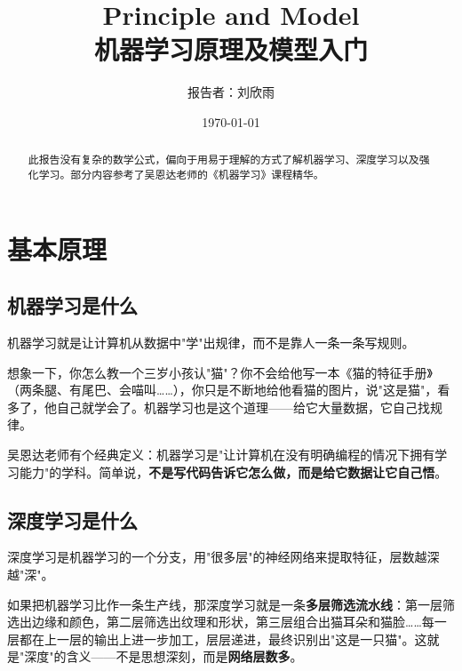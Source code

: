 \documentclass[12pt,a4paper]{ctexart}
\title{\textbf{Principle and Model} \\ \large 机器学习原理及模型入门}
\author{报告者：刘欣雨}
\date{\today}
\begin{document}
\maketitle

\begin{abstract}
此报告没有复杂的数学公式，偏向于用易于理解的方式了解机器学习、深度学习以及强化学习。部分内容参考了吴恩达老师的《机器学习》课程精华。
\end{abstract}

\tableofcontents
\newpage

\section{基本原理}

\subsection{机器学习是什么}

\begin{funbox}[一句话解释]
机器学习就是让计算机从数据中"学"出规律，而不是靠人一条一条写规则。
\end{funbox}

想象一下，你怎么教一个三岁小孩认"猫"？你不会给他写一本《猫的特征手册》（两条腿、有尾巴、会喵叫……），你只是不断地给他看猫的图片，说"这是猫"，看多了，他自己就学会了。机器学习也是这个道理——给它大量数据，它自己找规律。

吴恩达老师有个经典定义：机器学习是"让计算机在没有明确编程的情况下拥有学习能力"的学科。简单说，\textbf{不是写代码告诉它怎么做，而是给它数据让它自己悟}。

\subsection{深度学习是什么}

\begin{funbox}[一句话解释]
深度学习是机器学习的一个分支，用"很多层"的神经网络来提取特征，层数越深越"深"。
\end{funbox}

如果把机器学习比作一条生产线，那深度学习就是一条\textbf{多层筛选流水线}：第一层筛选出边缘和颜色，第二层筛选出纹理和形状，第三层组合出猫耳朵和猫脸……每一层都在上一层的输出上进一步加工，层层递进，最终识别出"这是一只猫"。这就是"深度"的含义——不是思想深刻，而是\textbf{网络层数多}。
\end{document}
